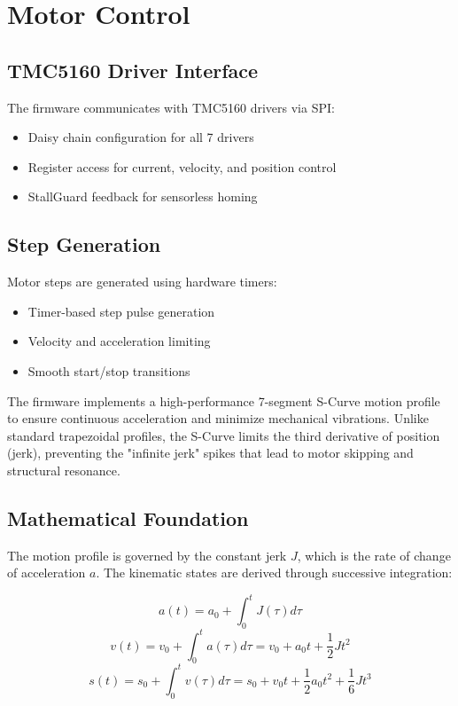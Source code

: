 \documentclass[12pt,a4paper]{report}
\begin{document}
\section{Motor Control}

\subsection{TMC5160 Driver Interface}

The firmware communicates with TMC5160 drivers via SPI:
\begin{itemize}
    \item Daisy chain configuration for all 7 drivers
    \item Register access for current, velocity, and position control
    \item StallGuard feedback for sensorless homing
\end{itemize}

\subsection{Step Generation}

Motor steps are generated using hardware timers:
\begin{itemize}
    \item Timer-based step pulse generation
    \item Velocity and acceleration limiting
    \item Smooth start/stop transitions
\end{itemize}

The firmware implements a high-performance 7-segment S-Curve motion profile to ensure continuous acceleration and minimize mechanical vibrations. Unlike standard trapezoidal profiles, the S-Curve limits the third derivative of position (jerk), preventing the "infinite jerk" spikes that lead to motor skipping and structural resonance.

\subsection{Mathematical Foundation}

The motion profile is governed by the constant jerk $J$, which is the rate of change of acceleration $a$. The kinematic states are derived through successive integration:

\begin{equation}
    a(t) = a_0 + \int_{0}^{t} J(\tau) d\tau
\end{equation}
\begin{equation}
    v(t) = v_0 + \int_{0}^{t} a(\tau) d\tau = v_0 + a_0 t + \frac{1}{2} J t^2
\end{equation}
\begin{equation}
    s(t) = s_0 + \int_{0}^{t} v(\tau) d\tau = s_0 + v_0 t + \frac{1}{2} a_0 t^2 + \frac{1}{6} J t^3
\end{equation}
\end{document}
